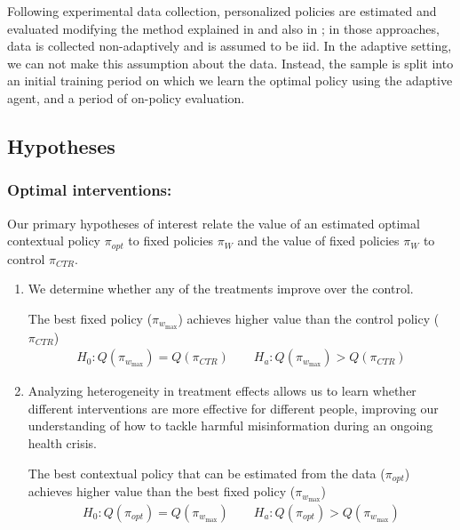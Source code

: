\documentclass[letterpaper, 12pt, parskip=full,DIV=12]{scrartcl}
\begin{document}
Following experimental data collection, personalized policies are estimated and evaluated modifying the method explained in \cite{athey2017efficient} and also in \cite{zhou2018offline}; in those approaches, data is collected non-adaptively and is assumed to be iid. In the adaptive setting, we can not make this assumption about the data. Instead, the sample is split into an initial training period on which we learn the optimal policy using the adaptive agent, and a period of on-policy evaluation. 


\subsection{Hypotheses}


\subsubsection{Optimal interventions:}

Our primary hypotheses of interest relate the value of an estimated optimal contextual policy $\pi_{opt}$ to fixed policies $\pi_{W}$ and the value of fixed policies $\pi_{W}$ to control $\pi_{CTR}$.


\begin{enumerate}
\item[ ] 
We determine whether any of the treatments improve over the control. 
\begin{hypothesis} The best fixed policy ($\pi_{w_{\textrm{max} } }$) achieves higher value than the control policy ($\pi_{CTR}$)   \label{eq:control_null}
\begin{align*}
H_{0}: Q(\pi_{w_{\textrm{max} } }) = Q(\pi_{CTR}) \qquad H_{a}:  Q(\pi_{w_{\textrm{max} } }) > Q(\pi_{CTR})
\end{align*}
\end{hypothesis}
  \item[ ]
  
  Analyzing heterogeneity in treatment effects allows us to learn whether different interventions are more effective for different people, improving our understanding of how to tackle harmful misinformation during an ongoing health crisis.
  \begin{hypothesis}
  The best contextual policy that can be estimated from the data ($\pi_{opt}$) achieves higher value than the best fixed policy ($\pi_{w_{\textrm{max} } }$)\label{eq:bestfix_null}
\begin{align*}
  H_{0}: Q(\pi_{opt}) = Q(\pi_{w_{\textrm{max}}}) \qquad H_{a}:  Q(\pi_{opt}) > Q(\pi_{w_{\textrm{max}}})
\end{align*}
\end{hypothesis}
\end{enumerate}
\end{document}
